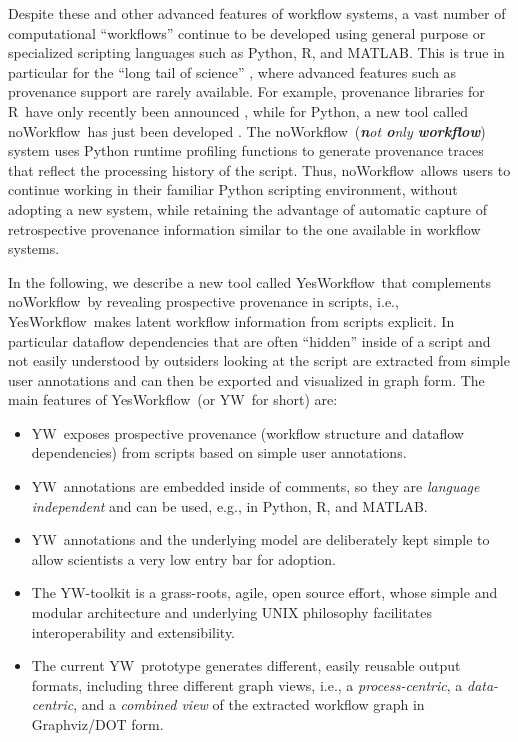 \documentclass[15]{ijdc-v9}
\newcommand{\NW}{\textsf{noWorkflow}}
\newcommand{\YW}{\textsf{YesWorkflow}}
\newcommand{\yw}{\textsf{YW}}
\newcommand{\R}{R}
\newcommand{\MATLAB}{MATLAB}
\begin{document}
Despite these and other advanced features of workflow systems,
a vast number of computational ``workflows'' continue to be developed
using general purpose or specialized scripting languages such as
Python, \R, and \MATLAB. This is true in particular for the ``long
tail of science'' \cite{wallis2013if,Heidorn2008Shedding}, where
advanced features such as provenance support are rarely available.
For example, provenance libraries for \R\ have only recently been
announced \cite{Lerner2014RDataTracker}, while for Python, a new tool
called \NW\ has just been developed \cite{murta2014noWorkflow}. The
\NW\ (\emph{\textbf{n}ot \textbf{o}nly \textbf{workflow}}) system uses
Python runtime profiling functions to generate provenance traces that
reflect the processing history of the script. Thus, \NW\ allows users
to continue working in their familiar Python scripting environment,
without adopting a new system, while retaining the advantage of
automatic capture of retrospective provenance information similar to
the one available in workflow systems.

In the following, we describe a new tool called \YW\  that
complements \NW\ by revealing prospective provenance in
scripts, i.e., \YW\ makes latent workflow information from scripts explicit. In
particular dataflow dependencies that are often ``hidden'' inside of a
script and not easily understood by outsiders looking at the script
are extracted from simple user annotations and can then be exported
and visualized in graph form. 
The main features of \YW\ (or \yw\ for short) are:
\begin{itemize}
\item \yw\ exposes prospective provenance (workflow structure and
  dataflow dependencies) from scripts based on simple user annotations.
\item \yw\ annotations are embedded inside of comments, so they
  are \emph{language independent} and can be used, e.g., in Python, \R,
  and \MATLAB.
\item \yw\ annotations and the underlying model are deliberately kept
  simple to allow scientists a very low entry bar for adoption.

\item The \yw-toolkit is a grass-roots, agile, open source effort, whose
 simple and modular architecture and underlying UNIX philosophy
 facilitates interoperability and extensibility.

\item The current \yw\ prototype generates different, easily reusable
  output formats, including three different graph views, i.e., a
  \emph{process-centric}, a \emph{data-centric}, and a \emph{combined
    view} of the extracted workflow graph in Graphviz/DOT form.
 \end{itemize}
\end{document}
